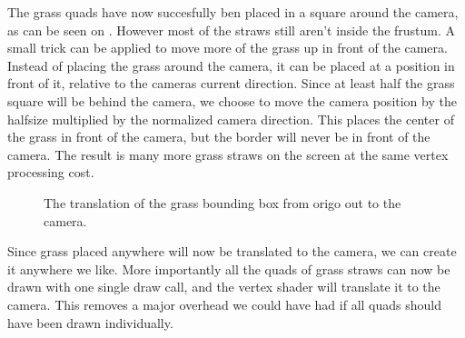 

The grass quads have now succesfully ben placed in a square around the
camera, as can be seen on . However most
of the straws still aren't inside the frustum. A small trick can be
applied to move more of the grass up in front of the camera. Instead
of placing the grass around the camera, it can be placed at a position
in front of it, relative to the cameras current direction. Since at
least half the grass square will be behind the camera, we choose to
move the camera position by the halfsize multiplied by the normalized
camera direction. This places the center of the grass in front of the
camera, but the border will never be in front of the camera. The
result is many more grass straws on the screen at the same vertex
processing cost.

\begin{figure}
  \centering
  \label{fig:grassTranslation}
  \caption{The translation of the grass bounding box from origo out to the camera.}
\end{figure}



Since grass placed anywhere will now be translated to the camera, we
can create it anywhere we like. More importantly all the quads of
grass straws can now be drawn with one single draw call, and the
vertex shader will translate it to the camera. This removes a major
overhead we could have had if all quads should have been drawn
individually.

